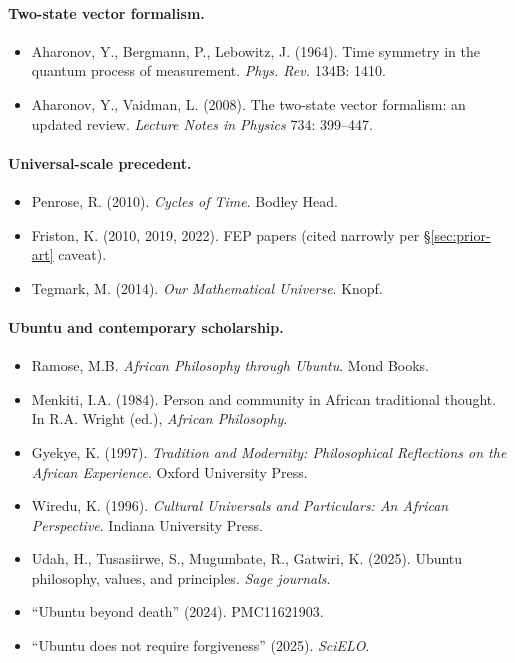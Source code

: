 \documentclass[11pt,a4paper]{article}
\begin{document}
\paragraph{Two-state vector formalism.}
\begin{itemize}[leftmargin=*,itemsep=2pt]
\item Aharonov, Y., Bergmann, P., Lebowitz, J. (1964). Time symmetry in the quantum process of measurement. \emph{Phys. Rev.} 134B: 1410.
\item Aharonov, Y., Vaidman, L. (2008). The two-state vector formalism: an updated review. \emph{Lecture Notes in Physics} 734: 399--447.
\end{itemize}

\paragraph{Universal-scale precedent.}
\begin{itemize}[leftmargin=*,itemsep=2pt]
\item Penrose, R. (2010). \emph{Cycles of Time}. Bodley Head.
\item Friston, K. (2010, 2019, 2022). FEP papers (cited narrowly per \S\ref{sec:prior-art} caveat).
\item Tegmark, M. (2014). \emph{Our Mathematical Universe}. Knopf.
\end{itemize}

\paragraph{Ubuntu and contemporary scholarship.}
\begin{itemize}[leftmargin=*,itemsep=2pt]
\item Ramose, M.B. \emph{African Philosophy through Ubuntu}. Mond Books.
\item Menkiti, I.A. (1984). Person and community in African traditional thought. In R.A. Wright (ed.), \emph{African Philosophy}.
\item Gyekye, K. (1997). \emph{Tradition and Modernity: Philosophical Reflections on the African Experience}. Oxford University Press.
\item Wiredu, K. (1996). \emph{Cultural Universals and Particulars: An African Perspective}. Indiana University Press.
\item Udah, H., Tusasiirwe, S., Mugumbate, R., Gatwiri, K. (2025). Ubuntu philosophy, values, and principles. \emph{Sage journals}.
\item ``Ubuntu beyond death'' (2024). PMC11621903.
\item ``Ubuntu does not require forgiveness'' (2025). \emph{SciELO}.
\end{itemize}
\end{document}
